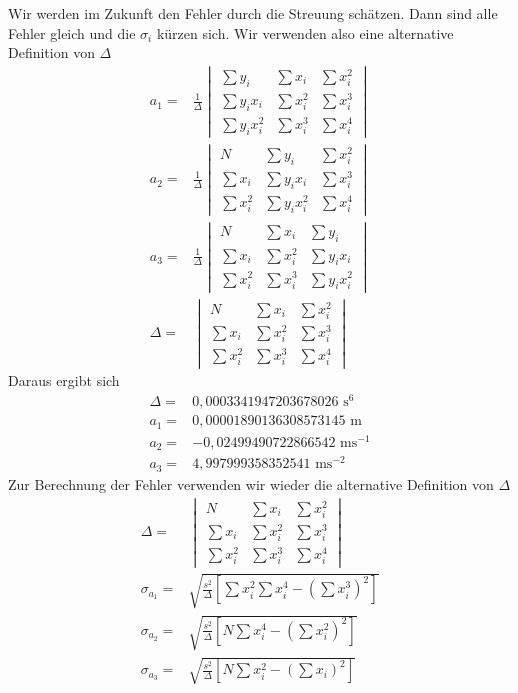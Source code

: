\documentclass[prb,12pt]{revtex4-2}
\theoremstyle{definition}
\theoremstyle{definition}
\begin{document}
Wir werden im Zukunft den Fehler durch die Streuung schätzen. Dann sind alle Fehler gleich und die $\sigma_i$ kürzen sich. Wir verwenden also eine alternative Definition von $\Delta$
\begin{align*}
	a_1=&\frac 1\Delta \begin{vmatrix}
		\sum y_i & \sum x_i & \sum x_i^2 \\ \sum y_i x_i & \sum x_i^2 & \sum x_i^3 \\
		\sum y_i x_i^2 & \sum x_i^3 & \sum x_i^4
	\end{vmatrix}\\
	a_2=&\frac 1\Delta \begin{vmatrix}
		N & \sum y_i & \sum x_i^2 \\ \sum x_i & \sum y_i x_i & \sum x_i^3 \\
		\sum x_i^2 & \sum y_i x_i^2 & \sum x_i^4
	\end{vmatrix}\\
	a_3=& \frac 1\Delta \begin{vmatrix}
		N & \sum x_i & \sum y_i \\
		\sum x_i & \sum x_i^2 & \sum y_i x_i \\
		\sum x_i^2 & \sum x_i^3 & \sum y_i x_i^2
	\end{vmatrix}\\
	\Delta=&\begin{vmatrix}
		N & \sum x_i & \sum x_i^2 \\ \sum x_i & \sum x_i^2 & \sum x_i^3 \\
		\sum x_i^2 & \sum x_i^3 & \sum x_i^4
	\end{vmatrix}
\end{align*}
Daraus ergibt sich
\begin{align*}
	\Delta=&0,0003341947203678026\text{ s}^{6}\\
	a_1=&0,00001890136308573145\text{ m}\\
	a_2=&-0,02499490722866542\text{ ms}^{-1}\\
	a_3=&4,997999358352541\text{ ms}^{-2}
\end{align*}
Zur Berechnung der Fehler verwenden wir wieder die alternative Definition von $\Delta$
\begin{align*}
	\Delta=&\begin{vmatrix}
	N & \sum x_i & \sum x_i^2 \\ \sum x_i & \sum x_i^2 & \sum x_i^3 \\
	\sum x_i^2 & \sum x_i^3 & \sum x_i^4
\end{vmatrix}\\
\sigma_{a_1}=&\sqrt{\frac{s^2}{\Delta}\left[\sum  x_i^2 \sum x_i^4 - \left(\sum x_i^3\right)^2\right]}\\
\sigma_{a_2}=&\sqrt{\frac{s^2}{\Delta}\left[N \sum x_i^4 - \left(\sum x_i^2\right)^2\right]}\\
\sigma_{a_3}=&\sqrt{\frac{s^2}{\Delta}\left[N \sum x_i^2 - (\sum x_i)^2\right]}
\end{align*}
\end{document}
